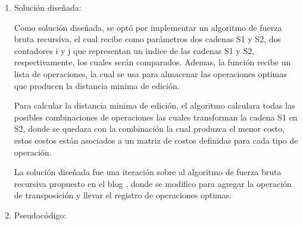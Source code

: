 
\begin{enumerate}[1)]
    \item Solución diseñada:

Como solución diseñada, se optó por implementar un algoritmo de fuerza
bruta recursiva, el cual recibe como parámetros dos cadenas S1 y S2, dos 
contadores i y j que representan un indice de las cadenas S1 y S2, respectivamente, los cuales serán comparados.
Ademas, la función recibe un lista de operaciones, la cual se usa para almacenar
las operaciones optimas que producen la distancia minima de edición.

Para calcular la distancia minima de edición, el algoritmo calculara todas las posibles
combinaciones de operaciones las cuales transforman la cadena S1 en S2, donde se quedara
con la combinación la cual produzca el menor costo, estos costos están asociados
a un matriz de costos definidas para cada tipo de operación.

La solución diseñada fue una iteración sobre al algoritmo de fuerza bruta
recursiva propuesto en el 
blog \citeauthor{EditDistance} \cite{EditDistance}
, donde se modifico para agregar la operación de transposición y llevar el registro
de operaciones optimas.


\item Pseudocódigo:


\begin{algorithm}[H]

    \DontPrintSemicolon
    \footnotesize

\end{algorithm}
\end{enumerate}
